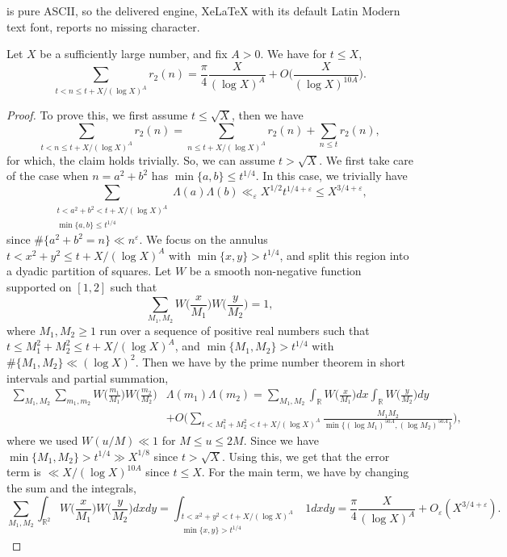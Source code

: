 \documentclass[10pt,a4paper]{amsart}
\newcommand{\R}{\mathbb{R}}
\renewcommand{\geq}{\geqslant}
\renewcommand{\leq}{\leqslant}
\begin{document}
is pure ASCII, so the delivered engine, XeLaTeX with its default Latin Modern text font, reports no missing character.
\begin{lem}\label{prime_number_theorem_in_short_int}
Let $X$ be a sufficiently large number, and fix $A>0$. We have for $t\leq X$,
$$ \sum_{t<n\leq t + X/(\log X)^A} r_2(n) = \frac{\pi}{4} \frac{X}{(\log X)^A} + O\bigg( \frac{X}{(\log X)^{10A}} \bigg). $$
\end{lem}

\begin{proof}
To prove this, we first assume $t\leq \sqrt{X}$, then we  have
$$ \sum_{t<n\leq t + X/(\log X)^A} r_2(n)= \sum_{n\leq t + X/(\log X)^A} r_2(n) + \sum_{n\leq t} r_2(n), $$
for which, the claim holds trivially.
So, we can assume $t>\sqrt{X}$. We first take care of the case when $n=a^2+b^2$ has $\min\{a,b\} \leq t^{1/4}$. In this case, we trivially have
$$ \sum_{\substack{t<a^2+b^2<t+X/(\log X)^A \\ \min\{a,b\}\leq t^{1/4}}} \Lambda(a)\Lambda(b) \ll_{\varepsilon} X^{1/2}t^{1/4+\varepsilon} \leq X^{3/4+\varepsilon},  $$
since $\#\{a^2+b^2=n\} \ll n^{\varepsilon}$. We focus on the annulus $t < x^2+y^2 \leq t+X/(\log X)^A$ with $\min\{x,y\}>t^{1/4}$, and split this region into a dyadic partition of squares. Let $W$ be a smooth non-negative function supported on $[1,2]$ such that
$$ \sum_{M_1,M_2} W\bigg( \frac{x}{M_1} \bigg)W\bigg( \frac{y}{M_2} \bigg) = 1, $$
where $M_1,M_2\geq 1$ run over a sequence of positive real numbers such that $t\leq M_1^2+M_2^2 \leq t + X/(\log X)^A$, and $\min\{M_1,M_2\} > t^{1/4}$ with  $\#\{M_1,M_2\} \ll (\log X)^2$.
Then we have by the prime number theorem in short intervals and partial summation,
\begin{align*}
\sum_{M_1,M_2} \sum_{m_1,m_2} W\bigg( \frac{m_1}{M_1} \bigg)W\bigg( \frac{m_2}{M_2} \bigg)  &\Lambda(m_1) \Lambda(m_2) = \sum_{M_1,M_2} \int_{\R} W\bigg( \frac{x}{M_1} \bigg) dx \int_{\R}W\bigg( \frac{y}{M_2} \bigg) dy   \\
&+ O\bigg( \sum_{t<M_1^2+M_2^2<t+X/(\log X)^A} \frac{M_1M_2}{\min\{(\log M_1)^{50A} , (\log M_2)^{50A}\}} \bigg),
\end{align*}
where we used $W( u /M ) \ll 1$ for $M\leq u \leq 2M$.
Since we have $\min\{M_1,M_2\} > t^{1/4} \gg X^{1/8}$ since $t>\sqrt{X}$. Using this, we get that the error term is $\ll X/(\log X)^{10A}$ since $t\leq X$. For the main term, we have by changing the sum and the integrals,
$$ \sum_{M_1,M_2} \int_{\R^2} W\bigg( \frac{x}{M_1} \bigg) W\bigg( \frac{y}{M_2} \bigg) dxdy  = \int_{\substack{t<x^2+y^2 <t+X/(\log X)^A \\ \min\{x,y\} > t^{1/4}}} 1 dxdy = \frac{\pi}{4}\frac{X}{(\log X)^A} + O_{\varepsilon}(X^{3/4+\varepsilon}).$$
\end{proof}
\end{document}
